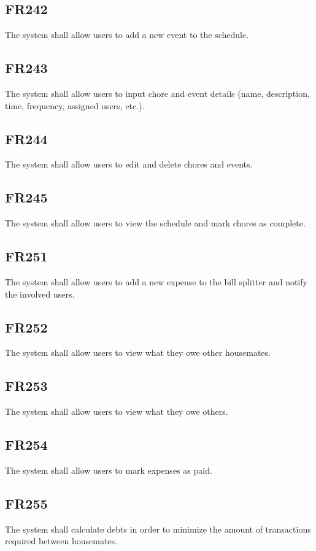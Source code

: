 \documentclass[12pt, titlepage]{article}
\begin{document}
\subsection{FR242}
The system shall allow users to add a new event to the schedule.

\subsection{FR243}
The system shall allow users to input chore and event details (name, description, time, frequency, assigned users, etc.).

\subsection{FR244}
The system shall allow users to edit and delete chores and events.

\subsection{FR245}
The system shall allow users to view the schedule and mark chores as complete.

\subsection{FR251}
The system shall allow users to add a new expense to the bill splitter and notify the involved users.

\subsection{FR252}
The system shall allow users to view what they owe other housemates.

\subsection{FR253}
The system shall allow users to view what they owe others.

\subsection{FR254}
The system shall allow users to mark expenses as paid.

\subsection{FR255}
The system shall calculate debts in order to minimize the amount of transactions required between housemates.
\end{document}

